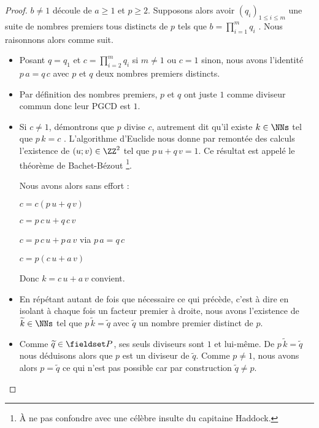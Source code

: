 \begin{proof}
	$b \neq 1$ découle de $a \geq 1$ et $p \geq 2$. 
	Supposons alors avoir $(q_i)_{1 \leq i \leq m}$ une suite de nombres premiers tous distincts de $p$ tels que $\displaystyle b = \prod_{i=1}^{m} q_i$ .
	Nous raisonnons alors comme suit.
	\begin{itemize}[label=\small\textbullet]
		\item Posant $q = q_1$ et $\displaystyle c = \prod_{i=2}^{m} q_i$ si $m \neq 1$ ou $c=1$ sinon, nous avons l'identité $p \, a = q \, c$ avec $p$ et $q$ deux nombres premiers distincts.
		
		
		\item Par définition des nombres premiers, $p$ et $q$ ont juste $1$ comme diviseur commun donc leur PGCD est $1$.

	
		\item Si $c \neq 1$, démontrons que $p$ divise $c$, autrement dit qu'il existe $k \in \NNs$ tel que $p \, k = c$ .
		L'algorithme d'Euclide nous donne par remontée des calculs l'existence de $(u ; v) \in \ZZ^2$ tel que $p \, u + q \, v = 1$. Ce résultat est appelé le théorème de Bachet-Bézout
		\footnote{
			À ne pas confondre avec une célèbre insulte du capitaine Haddock.
		}.
		
		\smallskip
		\noindent
		Nous avons alors sans effort :
		
		\smallskip
		\noindent
		$c = c(p \, u + q \, v)$
		
		\smallskip
		\noindent
		$c = p \, c \, u + q \, c \, v$
		
		\smallskip
		\noindent
		$c = p \, c \, u + p \, a \, v$ via $p \, a = q \, c$
		
		\smallskip
		\noindent
		$c = p(c \, u + a \, v)$
		
		\smallskip
		\noindent
		Donc $k = c \, u + a \, v$ convient.
		
		
		\item En répétant autant de fois que nécessaire ce qui précède, c'est à dire en isolant à chaque fois un facteur premier à droite, nous avons l'existence de $\widetilde{k} \in \NNs$ tel que $p \, \widetilde{k} = \widetilde{q}$ avec $\widetilde{q}$ un nombre premier distinct de $p$.

	
		\item Comme $\widetilde{q} \in \PP$, ses seuls diviseurs sont $1$ et lui-même. De $p \, \widetilde{k} = \widetilde{q}$ nous déduisons alors que $p$ est un diviseur de $\widetilde{q}$. Comme $p \neq 1$, nous avons alors $p = \widetilde{q}$ ce qui n'est pas possible car par construction $\widetilde{q} \neq p$.
	\end{itemize}
\end{proof}



